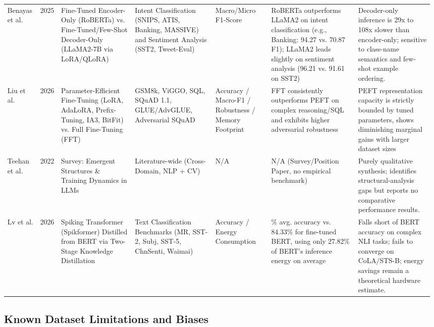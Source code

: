 \documentclass[conference]{IEEEtran}
\begin{document}
\begin{table}[t]
\begin{tabularx}{\textwidth}{@{} >{\hsize=0.85\hsize}X c >{\hsize=1.05\hsize}X >{\hsize=1.0\hsize}X >{\hsize=0.85\hsize}X >{\hsize=1.05\hsize}X >{\hsize=1.2\hsize}X @{}}
Benayas et al. \cite{benayas2025comparative} & 2025 & Fine-Tuned Encoder-Only (RoBERTa) vs. Fine-Tuned/Few-Shot Decoder-Only (LLaMA2-7B via LoRA/QLoRA) & Intent Classification (SNIPS, ATIS, Banking, MASSIVE) and Sentiment Analysis (SST2, Tweet-Eval) & Macro/Micro F1-Score & RoBERTa outperforms LLaMA2 on intent classification (e.g., Banking: 94.27 vs. 70.87 F1); LLaMA2 leads slightly on sentiment analysis (96.21 vs. 91.61 on SST2) & Decoder-only inference is 29x to 108x slower than encoder-only; sensitive to class-name semantics and few-shot example ordering. \\
\addlinespace

Liu et al. \cite{liu-etal-2026-look} & 2026 & Parameter-Efficient Fine-Tuning (LoRA, AdaLoRA, Prefix-Tuning, IA3, BitFit) vs. Full Fine-Tuning (FFT) & GSM8k, ViGGO, SQL, SQuAD 1.1, GLUE/AdvGLUE, Adversarial SQuAD & Accuracy / Macro-F1 / Robustness / Memory Footprint & FFT consistently outperforms PEFT on complex reasoning/SQL and exhibits higher adversarial robustness & PEFT representation capacity is strictly bounded by tuned parameters, shows diminishing marginal gains with larger dataset sizes \\
\addlinespace

Teehan et al. \cite{teehan2022emergent} & 2022 & Survey: Emergent Structures \& Training Dynamics in LLMs & Literature-wide (Cross-Domain, NLP + CV) & N/A & N/A (Survey/Position Paper, no empirical benchmark) & Purely qualitative synthesis; identifies structural-analysis gaps but reports no comparative performance results. \\
\addlinespace

Lv et al. \cite{lv2026spikebert} & 2026 & Spiking Transformer (Spikformer) Distilled from BERT via Two-Stage Knowledge Distillation & 6 Text Classification Benchmarks (MR, SST-2, Subj, SST-5, ChnSenti, Waimai) & Accuracy / Energy Consumption & 80.20\% avg. accuracy vs. 84.33\% for fine-tuned BERT, using only 27.82\% of BERT's inference energy on average & Falls short of BERT accuracy on complex NLI tasks; fails to converge on CoLA/STS-B; energy savings remain a theoretical hardware estimate. \\

\bottomrule
\end{tabularx}
\end{table}

\subsection{Known Dataset Limitations and Biases}
\end{document}
